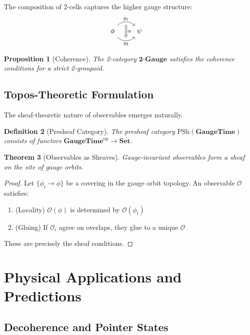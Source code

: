 \documentclass[12pt,a4paper]{article}
\newtheorem{theorem}{Theorem}[section]
\newtheorem{proposition}[theorem]{Proposition}
\newtheorem{definition}[theorem]{Definition}
\newcommand{\Cat}[1]{\mathbf{#1}}
\newcommand{\Set}{\Cat{Set}}
\newcommand{\op}{\mathrm{op}}
\newcommand{\PSh}{\mathrm{PSh}}
\begin{document}
The composition of 2-cells captures the higher gauge structure:
\[
\begin{tikzcd}
\phi \arrow[r, bend left=50, "g_1", ""{name=A, below}] 
\arrow[r, bend right=50, "g_2"', ""{name=B, above}] & \psi
\arrow[from=A, to=B, Rightarrow, "\alpha"]
\end{tikzcd}
\]

\begin{proposition}[Coherence]
The 2-category $\mathbf{2\text{-}Gauge}$ satisfies the coherence conditions for a strict 2-groupoid.
\end{proposition}

\subsection{Topos-Theoretic Formulation}

The sheaf-theoretic nature of observables emerges naturally.

\begin{definition}[Presheaf Category]
The presheaf category $\PSh(\mathbf{GaugeTime})$ consists of functors $\mathbf{GaugeTime}^{\op} \to \Set$.
\end{definition}

\begin{theorem}[Observables as Sheaves]
Gauge-invariant observables form a sheaf on the site of gauge orbits.
\end{theorem}

\begin{proof}
Let $\{\phi_i \to \phi\}$ be a covering in the gauge orbit topology. An observable $\mathcal{O}$ satisfies:
\begin{enumerate}
\item (Locality) $\mathcal{O}(\phi)$ is determined by $\mathcal{O}(\phi_i)$
\item (Gluing) If $\mathcal{O}_i$ agree on overlaps, they glue to a unique $\mathcal{O}$
\end{enumerate}
These are precisely the sheaf conditions.
\end{proof}

\section{Physical Applications and Predictions}

\subsection{Decoherence and Pointer States}
\end{document}
